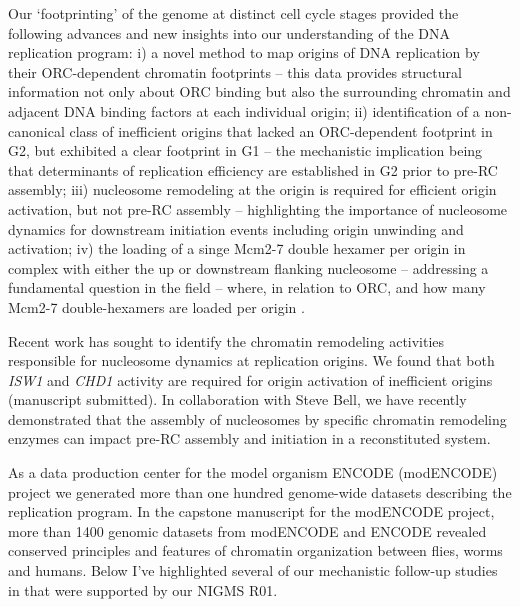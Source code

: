 Our `footprinting' of the \scer genome at distinct cell cycle stages provided the  %
following advances and new insights into our understanding of the DNA replication program: i) a novel method to map origins of DNA replication by their ORC-dependent chromatin footprints -- this data provides structural information not only about ORC binding but also the surrounding chromatin and adjacent DNA binding factors at each individual origin; ii) identification of a non-canonical class of inefficient origins that lacked an ORC-dependent footprint in G2, but exhibited a clear footprint in G1 -- the mechanistic implication being that determinants of replication efficiency are established in G2 prior to pre-RC assembly; iii) nucleosome remodeling at the origin is required for efficient origin activation, but not pre-RC assembly -- highlighting the importance of nucleosome dynamics for downstream initiation events including origin unwinding and activation; iv) the loading of a singe Mcm2-7 double hexamer per origin in complex with either the up or downstream flanking nucleosome -- addressing a fundamental question in the field -- where, in relation to ORC, and how many Mcm2-7 double-hexamers are loaded per origin \invivo. 

Recent work has sought to identify the chromatin remodeling activities responsible for nucleosome dynamics at replication origins.  %
We found that both \textit{ISW1} and \textit{CHD1} activity are required for origin activation of inefficient origins (manuscript submitted). In collaboration with Steve Bell, we have recently demonstrated that the \invitro assembly of nucleosomes by specific chromatin remodeling enzymes can impact pre-RC assembly and initiation in a reconstituted system\citep{Azmi2017-gg}.

As a data production center for the model organism ENCODE (modENCODE) project we generated more than one hundred genome-wide datasets describing the \dros replication program\citep{Mod_Encode_Consortium2010-io}.  In the capstone manuscript for the modENCODE project, more than 1400 genomic datasets from modENCODE and ENCODE revealed conserved principles and features of chromatin organization between flies, worms and humans\citep{Ho2014-xa}. %
Below I've highlighted several of our mechanistic follow-up studies in \dros that were supported by our NIGMS R01.

